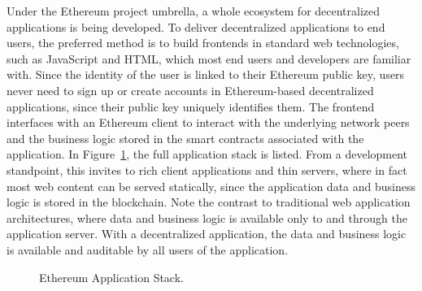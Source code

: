 Under the Ethereum project umbrella, a whole ecosystem for decentralized applications is being developed. To deliver decentralized applications to end users, the preferred method is to build frontends in standard web technologies, such as JavaScript and HTML, which most end users and developers are familiar with. Since the identity of the user is linked to their Ethereum public key, users never need to sign up or create accounts in Ethereum-based decentralized applications, since their public key uniquely identifies them. The frontend interfaces with an Ethereum client to interact with the underlying network peers and the business logic stored in the smart contracts associated with the application. In Figure~\ref{fig:tech:stack}, the full application stack is listed.
From a development standpoint, this invites to rich client applications and thin servers, where in fact most web content can be served statically, since the application data and business logic is stored in the blockchain. Note the contrast to traditional web application architectures, where data and business logic is available only to and through the application server. With a decentralized application, the data and business logic is available and auditable by all users of the application.


\begin{figure}[ht]
\centering
{}
\caption{Ethereum Application Stack.}
\label{fig:tech:stack}
\end{figure}

